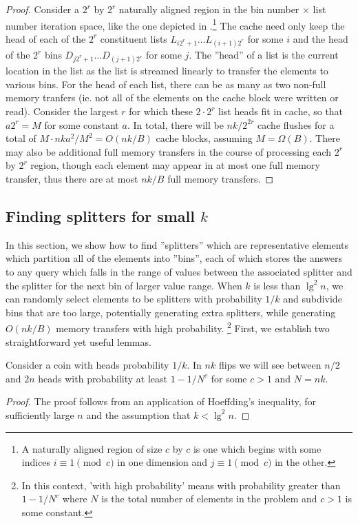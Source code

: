 \begin{proof}
Consider a $2^r$ by $2^r$ naturally aligned region in the bin number $\times$ list
number iteration space, like the one depicted in 
.\footnote{A naturally aligned region
of size $c$ by $c$ is one which begins with some indices $i \equiv 1 \pmod{c}$ 
in one dimension and $j \equiv 1 \pmod{c}$ in the other.}  
The cache need only keep the head of each of the $2^r$ constituent
lists $L_{i2^r + 1} \ldots L_{(i+1)2^r}$ for some $i$ and the head of the $2^r$ bins 
$D_{j2^r + 1} \ldots D_{(j+1)2^r}$ for some $j$. 
The ''head'' of a list is the current location
in the list as the list is streamed linearly to transfer the elements to various bins.  
For the head of each list, there can be as many as
two non-full memory tranfers (ie. not all of the elements on the cache block were
written or read).  Consider the largest $r$ for which these $2 \cdot 2^r$ list heads
fit in cache, so that $a2^r = M$ for some constant $a$.  In total, there will be 
$nk/2^{2r}$ cache flushes for a total of $M \cdot nka^2/M^2 = O(nk/B)$ cache blocks, 
assuming $M = \Omega(B)$.  There may also be additional full memory transfers in the
course of processing each $2^r$ by $2^r$ region, though
each element may appear in at most one full memory transfer, thus there are at most
$nk/B$ full memory transfers.  
\end{proof}

\subsection*{Finding splitters for small $k$}

In this section, we show how to find ''splitters'' which are representative elements
which partition all of the elements into ''bins'', each of which stores the answers to any
query which falls in the range of values between the associated splitter and the
splitter for the next bin of larger value range.
When $k$ is less than $\lg^2 n$, we can randomly select elements to be splitters
with probability $1/k$ and subdivide bins that are too large, potentially generating
extra splitters, while generating $O(nk/B)$ memory transfers with high probability.
\footnote{In this context, 'with high probability' means with probability greater
than $1-1/N^c$ where $N$ is the total number of elements in the problem and $c > 1$
is some constant.} First, we establish two straightforward yet useful lemmas.

\begin{lemma}
  Consider a coin with heads probability $1/k$.  In $nk$ flips we will see
  between $n/2$ and $2n$ heads with probability at least $1-1/N^c$ for some $c>1$
  and $N=nk$.
  \label{lem:number_of_flips}
\end{lemma}
\begin{proof}
  The proof follows from an application of Hoeffding's inequality, for sufficiently
  large $n$ and the assumption that $k < \lg ^2 n$.
\end{proof}

